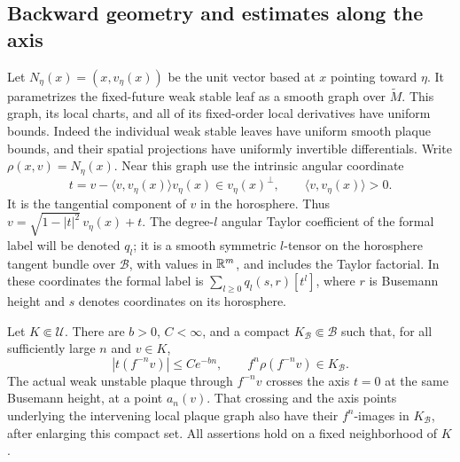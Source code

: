 \subsection{Backward geometry and estimates along the axis}

Let $N_\eta(x)=(x,v_\eta(x))$ be the unit vector based at $x$ pointing
toward $\eta$.  It parametrizes the fixed-future weak stable leaf as a
smooth graph over $\widetilde M$.  This graph, its local charts, and all
of its fixed-order local derivatives have uniform bounds.  Indeed the
individual weak stable leaves have uniform smooth plaque bounds, and
their spatial projections have uniformly invertible differentials.
Write $\rho(x,v)=N_\eta(x)$.  Near this graph use the intrinsic angular
coordinate
\[
 t= v-\langle v,v_\eta(x)\rangle v_\eta(x)
       \in v_\eta(x)^\perp,
 \qquad \langle v,v_\eta(x)\rangle>0.
\]
It is the tangential component of $v$ in the horosphere.  Thus
$v=\sqrt{1-|t|^2}\,v_\eta(x)+t$.  The degree-$l$ angular Taylor
coefficient of the formal label will be denoted $q_l$; it is a smooth
symmetric $l$-tensor on the horosphere tangent bundle over $\mathcal B$,
with values in $\mathbb R^m$, and includes the Taylor factorial.  In these
coordinates the formal label is $\sum_{l\geq0}q_l(s,r)[t^l]$, where $r$
is Busemann height and $s$ denotes coordinates on its horosphere.

\begin{lemma}
\label{smooth:backward-geometry}
Let $K\Subset\mathcal U$.  There are $b>0$, $C<\infty$, and a compact
$K_{\mathcal B}\Subset\mathcal B$ such that, for all sufficiently large
$n$ and $v\in K$,
\[
 |t(f^{-n}v)|\leq Ce^{-bn},\qquad
 f^n\rho(f^{-n}v)\in K_{\mathcal B}.
\]
The actual weak unstable plaque through $f^{-n}v$ crosses the axis
$t=0$ at the same Busemann height, at a point $a_n(v)$.  That crossing
and the axis points underlying the intervening local plaque graph also
have their $f^n$-images in $K_{\mathcal B}$, after enlarging this compact
set.  All assertions hold on a fixed neighborhood of $K$.
\end{lemma}

